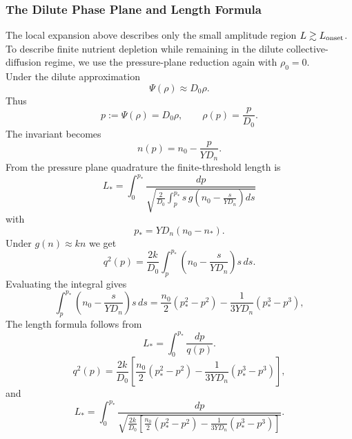 \documentclass[11pt,a4paper]{report}
\begin{document}
\subsubsection{The Dilute Phase Plane and Length Formula}
\label{subsec:dilute_phaseplane}

The local expansion above describes only the small amplitude region
$L\gtrsim L_{\rm onset}$.  To describe finite nutrient depletion while
remaining in the dilute collective-diffusion regime, we use the pressure-plane
reduction again with $\rho_0=0$.\\	
Under the dilute approximation
\begin{equation}
	\Psi(\rho)\approx D_0\rho.
\end{equation}
Thus
\begin{equation}
	p:=\Psi(\rho)=D_0\rho,
	\qquad
	\rho(p)=\frac{p}{D_0}.
	\label{eq:p_rho_dilute}
\end{equation}
The invariant becomes
\begin{equation}
	n(p)=n_0-\frac{p}{YD_n}.
	\label{eq:n_p_dilute_corrected}
\end{equation}
From the pressure plane quadrature the finite-threshold length is
\begin{equation}
	{
		L_*
		=
		\int_{0}^{p_*}
		\frac{dp}
		{
			\sqrt{
				\frac{2}{D_0}
				\int_p^{p_*}
				s\,
				g\!\left(
				n_0-\frac{s}{YD_n}
				\right)ds
			}
	}}
	\label{eq:Lstar_dilute_full_monod_rho0zero}
\end{equation}
with
\begin{equation}
	p_*=YD_n(n_0-n_*).
	\label{eq:pstar_dilute_rho0zero}
\end{equation}
Under $g(n)\approx kn$ we get
\begin{equation}
	q^2(p)
	=
	\frac{2k}{D_0}
	\int_p^{p_*}
	\left(n_0-\frac{s}{YD_n}\right)s\,ds.
\end{equation}
Evaluating the integral gives
\begin{equation}
	\int_p^{p_*}
	\left(n_0-\frac{s}{YD_n}\right)s\,ds
	=
	\frac{n_0}{2}(p_*^2-p^2)
	-
	\frac{1}{3YD_n}(p_*^3-p^3),
\end{equation}
The length formula follows
from
\[
L_*=\int_0^{p_*}\frac{dp}{q(p)}.
\]
\begin{equation}
	{
		q^2(p)
		=
		\frac{2k}{D_0}
		\left[
		\frac{n_0}{2}(p_*^2-p^2)
		-
		\frac{1}{3YD_n}(p_*^3-p^3)
		\right],
	}
	\label{eq:q2_dilute_linear_monod}
\end{equation}
and
\begin{equation}
	{
		L_*
		=
		\int_0^{p_*}
		\frac{dp}
		{
			\sqrt{
				\frac{2k}{D_0}
				\left[
				\frac{n_0}{2}(p_*^2-p^2)
				-
				\frac{1}{3YD_n}(p_*^3-p^3)
				\right]
			}
		}.
	}
	\label{eq:Lstar_dilute_linear_monod}
\end{equation}
\end{document}
